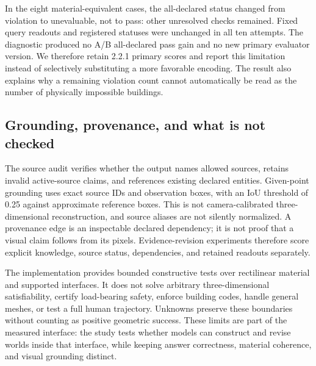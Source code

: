 In the eight material-equivalent cases, the all-declared status changed from violation to unevaluable, not to pass: other unresolved checks remained. Fixed query readouts and registered statuses were unchanged in all ten attempts. The diagnostic produced no A/B all-declared pass gain and no new primary evaluator version. We therefore retain 2.2.1 primary scores and report this limitation instead of selectively substituting a more favorable encoding. The result also explains why a remaining violation count cannot automatically be read as the number of physically impossible buildings.

\subsection{Grounding, provenance, and what is not checked}
The source audit verifies whether the output names allowed sources, retains invalid active-source claims, and references existing declared entities. Given-point grounding uses exact source IDs and observation boxes, with an IoU threshold of 0.25 against approximate reference boxes. This is not camera-calibrated three-dimensional reconstruction, and source aliases are not silently normalized. A provenance edge is an inspectable declared dependency; it is not proof that a visual claim follows from its pixels. Evidence-revision experiments therefore score explicit knowledge, source status, dependencies, and retained readouts separately.

The implementation provides bounded constructive tests over rectilinear material and supported interfaces. It does not solve arbitrary three-dimensional satisfiability, certify load-bearing safety, enforce building codes, handle general meshes, or test a full human trajectory. Unknowns preserve these boundaries without counting as positive geometric success. These limits are part of the measured interface: the study tests whether models can construct and revise worlds inside that interface, while keeping answer correctness, material coherence, and visual grounding distinct.
